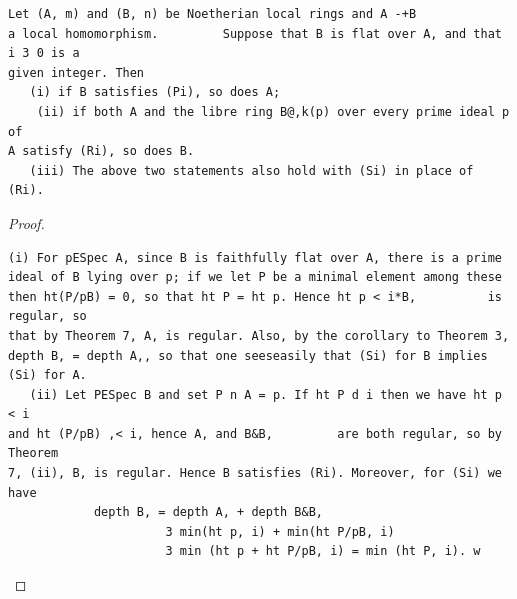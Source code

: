 \begin{theorem}\label{mcrt-auto-theorem-23-9}\uses{}
\begin{verbatim}
Let (A, m) and (B, n) be Noetherian local rings and A -+B
a local homomorphism.         Suppose that B is flat over A, and that i 3 0 is a
given integer. Then
   (i) if B satisfies (Pi), so does A;
    (ii) if both A and the libre ring B@,k(p) over every prime ideal p of
A satisfy (Ri), so does B.
   (iii) The above two statements also hold with (Si) in place of (Ri).
\end{verbatim}
\end{theorem}
\begin{proof}
\begin{verbatim}
(i) For pESpec A, since B is faithfully flat over A, there is a prime
ideal of B lying over p; if we let P be a minimal element among these
then ht(P/pB) = 0, so that ht P = ht p. Hence ht p < i*B,          is regular, so
that by Theorem 7, A, is regular. Also, by the corollary to Theorem 3,
depth B, = depth A,, so that one seeseasily that (Si) for B implies (Si) for A.
   (ii) Let PESpec B and set P n A = p. If ht P d i then we have ht p < i
and ht (P/pB) ,< i, hence A, and B&B,         are both regular, so by Theorem
7, (ii), B, is regular. Hence B satisfies (Ri). Moreover, for (Si) we have
            depth B, = depth A, + depth B&B,
                      3 min(ht p, i) + min(ht P/pB, i)
                      3 min (ht p + ht P/pB, i) = min (ht P, i). w
\end{verbatim}
\end{proof}


